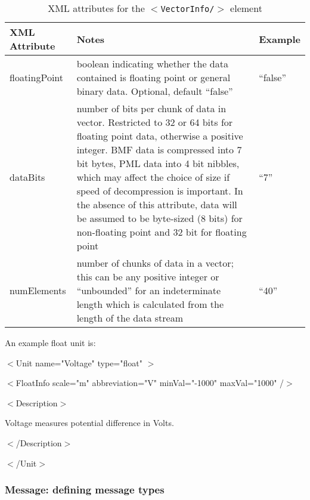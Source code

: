 \documentclass[pdftex,a4paper]{article}
\newcommand{\XML}[2][]{{\tt \small $<$#2#1/$>$}}
\newcommand{\XMLtext}[1]{
  \begin{tt}
    \begin{small}
      \begin{list}{}{
          \setlength{\topsep}{0pt}
          \setlength{\partopsep}{0pt}
          \setlength{\itemsep}{0pt}
          \setlength{\parsep}{0pt}
          \setlength{\leftmargin}{2em}
          \setlength{\rightmargin}{2em}
          \setlength{\labelsep}{0pt}
        }
      \item #1
      \end{list}
    \end{small}
  \end{tt}
}
\newcommand{\XMLfull}[3][]{\XMLtext{$<$#2#1$>$
    #3
  \item $<$/#2$>$}}
\newcommand{\XMLsimple}[2][]{\XMLtext{$<$#2#1/$>$}}
\begin{document}
\begin{table}[!h]
  \begin{center}
    \caption{XML attributes for the \XML{VectorInfo} element}
    \label{tab:vectorinfo-unit}
    \begin{tabular}{|l|p{6cm}|l|}
      \hline

      \textbf{XML Attribute} & \textbf{Notes} & \textbf{Example}\\

      \hline

      floatingPoint & boolean indicating whether the data contained is
      floating point or general binary data. Optional, default
      ``false'' & ``false''\\

      \hline

      dataBits & number of bits per chunk of data in
      vector. Restricted to 32 or 64 bits for floating point data,
      otherwise a positive integer. BMF data is compressed into 7 bit
      bytes, PML data into 4 bit nibbles, which may affect the choice
      of size if speed of decompression is important. In the absence
      of this attribute, data will be assumed to be byte-sized (8
      bits) for non-floating point and 32 bit for floating point &
      ``7'' \\

      \hline

      numElements & number of chunks of data in a vector; this can be
      any positive integer or ``unbounded'' for an indeterminate
      length which is calculated from the length of the data stream &
      ``40'' \\

      \hline

    \end{tabular}
  \end{center}
\end{table}

An example float unit is:

\XMLfull[ name="Voltage" type="float" ]{Unit}{

 \XMLsimple[ scale="m" abbreviation="V" minVal="-1000"
   maxVal="1000" ]{FloatInfo}

  \XMLfull{Description}{
    \XMLtext{Voltage measures potential difference in Volts.}
  }
}

\subsubsection{Message: defining message types}
\end{document}
